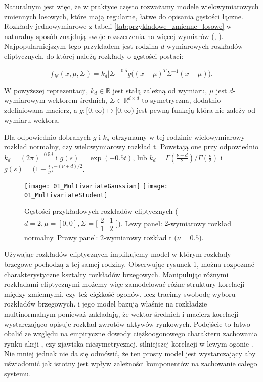 Naturalnym jest więc, że w praktyce często rozważamy modele wielowymiarowych zmiennych losowych, które mają regularne, łatwe do opisania gęstości łączne. Rozkłady jednowymiarowe z tabeli \ref{tab:przykladowe_zmienne_losowe} w naturalny sposób znajdują swoje rozszerzenia na więcej wymiarów (\cite{MultivariateDistributions}, \cite{Cherubini_Copula_Methods_in_Finance}). Najpopularniejszym tego przykładem jest rodzina $d$-wymiarowych rozkładów eliptycznych, do której należą rozkłady o gęstości postaci:

$$ f_{\mathcal{N}}(x, \mu, \Sigma) = k_d \vert\Sigma\vert^{-0.5}g\big((x-\mu)^T\Sigma^{-1}(x-\mu)\big).$$

W powyższej reprezentacji, $k_d \in\mathbb{R}$ jest stałą zależną od wymiaru, $\mu$ jest $d$-wymiarowym wektorem średnich, $\Sigma \in \mathbb{R}^{d \times d}$ to symetryczna, dodatnio zdefiniowana macierz, a $g \colon [0, \infty) \mapsto [0, \infty)$ jest pewną funkcją która nie zależy od wymiaru wektora.

Dla odpowiednio dobranych $g$ i $k_d$ otrzymamy w tej rodzinie wielowymiarowy rozkład normalny, czy wielowymiarowy rozkład t. Powstają one przy odpowiednio $k_d=(2\pi)^{-0.5d}$ i $g(s) = \exp(-0.5 t)$, lub $k_d=\Gamma(\frac{\nu + d}{2})/\Gamma(\frac{\nu}{2})$ i $g(s) = \big(1 + \frac{t}{\nu})^{-(\nu + d)/2}$.
\begin{figure}[H]
	\centering
	\texttt{[image: 01\_MultivariateGaussian]}	\texttt{[image: 01\_MultivariateStudent]}
	\caption{Gęstości przykładowych rozkładów eliptycznych ($d=2, \mu=[0, 0], \Sigma = \big[\begin{smallmatrix}2&1\\1&2\end{smallmatrix}\big]$). Lewy panel: $2$-wymiarowy rozkład normalny. Prawy panel: $2$-wymiarowy rozkład t ($\nu = 0.5$).\label{fig:multivariate_gaussian_student}}
\end{figure}

Używając rozkładów eliptycznych implikujemy model w którym rozkłady brzegowe pochodzą z tej samej rodziny. Obserwując rysunek \ref{fig:multivariate_gaussian_student}, można rozpoznać charakterystyczne kształty rozkładów brzegowych. Manipulując różnymi rozkładami eliptycznymi możemy więc zamodelować różne struktury korelacji między zmiennymi, czy też ciężkość ogonów, lecz tracimy swobodę wyboru rozkładów brzegowych. \cite{Markovitz_MPT} i jego model bazują właśnie na rozkładzie multinormalnym ponieważ zakładają, że wektor średnich i macierz korelacji wystarczająco opisuje rozkład zwrotów aktywów rynkowych. Podejście to łatwo obalić ze względu na empiryczne dowody ciężkoogonowego charakteru zachowania rynku akcji \cite{Mandelbrot_NonGaussianity}, czy zjawiska niesymetrycznej, silniejszej korelacji w lewym ogonie \cite{AssymetricEquityDependency}. Nie mniej jednak nie da się odmówić, że ten prosty model jest wystarczający aby uświadomić jak istotny jest wpływ zależności komponentów na zachowanie całego systemu.\\